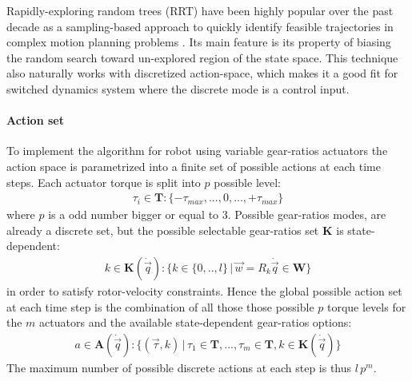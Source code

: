 Rapidly-exploring random trees (RRT) have been highly popular over the past decade as a sampling-based approach to quickly identify feasible trajectories in complex motion planning problems \cite{lavalle_rapidly-exploring_1998}\cite{lavalle_planning_2006}. Its main feature is its property of biasing the random search toward un-explored region of the state space. This technique also naturally works with discretized action-space, which makes it a good fit for switched dynamics system where the discrete mode is a control input.


\paragraph{Action set}
%
To implement the algorithm for robot using variable gear-ratios actuators the action space is parametrized into a finite set of possible actions at each time steps. Each actuator torque is split into $p$ possible level:
%
\begin{align}
\tau_i  \in \boldsymbol{T} : \{ -\tau_{max} , ... , 0 , ... , +\tau_{max} \}
\end{align}
%
where $p$ is a odd number bigger or equal to 3. Possible gear-ratios modes, are already a discrete set, but the possible selectable gear-ratios set $\boldsymbol{K}$ is state-dependent:
%
\begin{align}
k \in \boldsymbol{K}(\dot{\vec{q}}) : \big\{ k \in \{0,..,l\} \,|\, \vec{w} = R_k \dot{\vec{q}} \in \boldsymbol{W} \big\}
\end{align}
%
in order to satisfy rotor-velocity constraints. Hence the global possible action set at each time step is the combination of all those those possible $p$ torque levels for the $m$ actuators and the available state-dependent gear-ratios options:
%
\begin{align}
a \in \boldsymbol{A}(\dot{\vec{q}}) : \big\{ \left( \vec{\tau} , k \right) \,|\, \tau_1  \in \boldsymbol{T}  , ...  ,  \tau_m  \in \boldsymbol{T} ,  k \in \boldsymbol{K}(\dot{\vec{q}})  \big\}
\end{align}
%
The maximum number of possible discrete actions at each step is thus $l\,p^m$.


